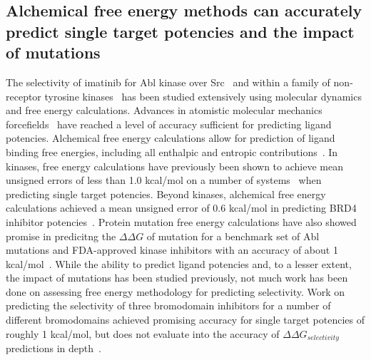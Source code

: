 \documentclass[phd,tocprelim]{cornell}
\begin{document}
\subsection{Alchemical free energy methods can accurately predict single target potencies and the impact of mutations}
 The selectivity of imatinib for Abl kinase over Src~\citep{Lin2013-ft,Lin2014-iv} and within a family of non-receptor tyrosine kinases~\citep{Lin2013-mu} has been studied extensively using molecular dynamics and free energy calculations. Advances in atomistic molecular mechanics forcefields~\citep{Huang:J.Comput.Chem.:2013,Maier:J.Chem.TheoryComput.:2015,Harder:J.Chem.TheoryComput.:2016,Cournia:2017ip} have reached a level of accuracy  sufficient for predicting ligand potencies. Alchemical free energy calculations allow for prediction of ligand binding free energies, including all enthalpic and entropic contributions~\citep{Chodera2011-jn}. In kinases, free energy calculations have previously been shown to achieve mean unsigned errors of less than 1.0 kcal/mol on a number of systems~\citep{Wang:J.Am.Chem.Soc.:2015,Abel:Curr.Opin.Struct.Biol.:2017,abel2017accelerating} when predicting single target potencies. Beyond kinases, alchemical free energy calculations achieved a mean unsigned error of 0.6 kcal/mol in predicting BRD4 inhibitor potencies~\citep{Aldeghi2015-lf}. Protein mutation free energy calculations have also showed promise in predicitng the $\Delta \Delta G$ of mutation for a benchmark set of Abl mutations and FDA-approved kinase inhibitors with an accuracy of about 1 kcal/mol~\citep{Hauser:2018vz}.  While the ability to predict ligand potencies and, to a lesser extent, the impact of mutations has been studied previously, not much work has been done on assessing free energy methodology for predicting selectivity. Work on predicting the selectivity of three bromodomain inhibitors for a number of different bromodomains achieved promising accuracy for single target potencies of roughly 1 kcal/mol, but does not evaluate into the accuracy of $\Delta \Delta G_{selectivity}$ predictions in depth~\citep{Aldeghi2017-ox}. 
\end{document}
